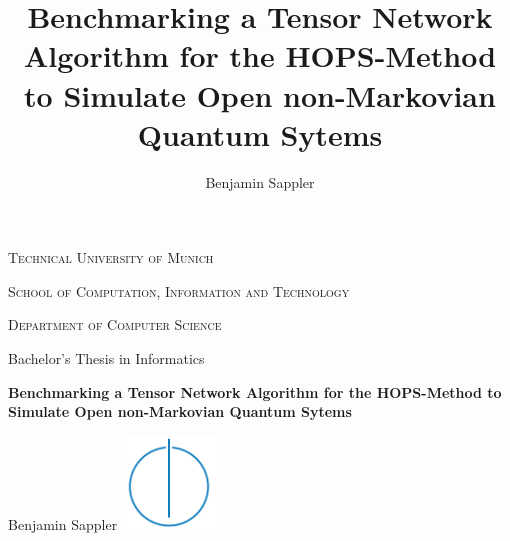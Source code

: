 \documentclass[%
thesis=student,%
coverpage=false,%
titlepage=false,%
headmarks=true, %
twoside=false,
english,%
font=libertine, %
math=newpxtx, %
BCOR=5mm,%
coverBCOR=11mm,%
]{tumbook}
\title{Benchmarking a Tensor Network Algorithm for the HOPS-Method to Simulate Open non-Markovian Quantum Sytems}
\author{Benjamin Sappler}
\begin{document}
\begin{center}
    \thispagestyle{empty}
    \theTUMLogo[height=2.5cm, color=TUMBlue]
    \vspace*{0.5cm}
    \par\textsc{\Huge Technical University of Munich}
    \vspace*{0.5cm}
    \par\textsc{\Large School of Computation, Information and Technology}
    \vspace*{0.3cm}
    \par\textsc{\Large Department of Computer Science}
    \vspace*{2cm}
    \par\Large Bachelor's Thesis in Informatics
    \vspace*{1.5cm}
    \par\textbf{\Huge Benchmarking a Tensor Network Algorithm for the HOPS-Method to Simulate Open non-Markovian Quantum Sytems}
    \vspace*{1.5cm}
    \par\Large Benjamin Sappler
    \vfill
    \includegraphics[width=2.5cm]{TUM_IN_Logo.pdf}
    \vfill
\end{center}

\newpage
\end{document}

